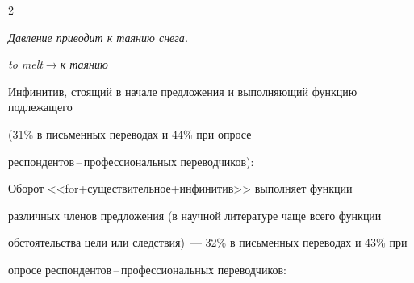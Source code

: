 \begin{multicols}{2}
\begin{enumerate}[(1)]
\textit{Давление приводит к таянию снега.}





\textit{to melt}\;$\rightarrow$\;\textit{к таянию}


\end{enumerate}





{\sf Инфинитив, стоящий в начале предложения и выполняющий функцию подлежащего 


(31\% в письменных переводах и 44\% при опросе 


рес\-пон\-ден\-тов\,--\,про\-фес\-сио\-наль\-ных переводчиков):}







{\sf Оборот <<for\;+\;существительное\;+\;инфинитив>> выполняет функции 


различных членов предложения (в научной литературе чаще всего функции 


обстоятельства цели или следствия)~--- 32\% в письменных переводах и 43\% при 


опросе рес\-пон\-ден\-тов\,--\,про\-фес\-сио\-наль\-ных переводчиков:}


\end{multicols}
